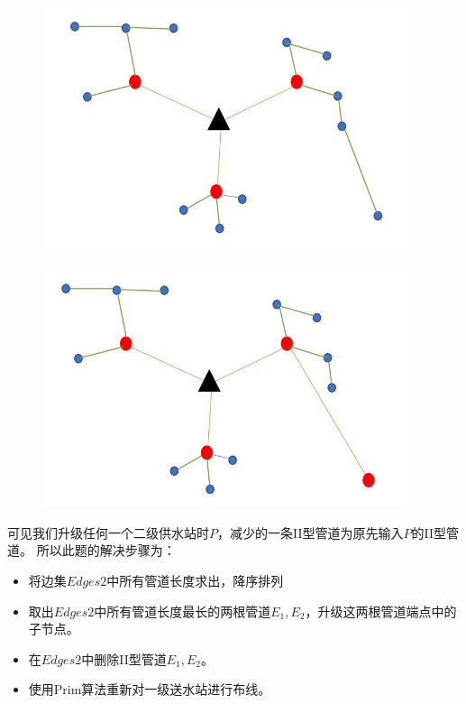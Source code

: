 \documentclass{cumcmthesis}
\begin{document}
  \begin{figure}[!h]
    \centering
    \begin{minipage}[c]{0.4\textwidth}
        \centering
        \includegraphics[width=0.95\textwidth]{figure/b.jpg}
        \label{fig:sample-figure-a}
    \end{minipage}
    \begin{minipage}[c]{0.4\textwidth}
        \centering
        \includegraphics[width=0.95\textwidth]{figure/c.jpg}
        \label{fig:sample-figure-b}
    \end{minipage}
    \label{fig:sample-figure}
  \end{figure}
可见我们升级任何一个二级供水站时$P$，减少的一条II型管道为原先输入$P$的II型管道。
所以此题的解决步骤为：
\begin{itemize}
  \item 将边集$Edges2$中所有管道长度求出，降序排列
  \item 取出$Edges2$中所有管道长度最长的两根管道$E_1,E_2$，升级这两根管道端点中的子节点。
  \item 在$Edges2$中删除II型管道$E_1,E_2$。
  \item 使用Prim算法重新对一级送水站进行布线。
\end{itemize}
\end{document}
